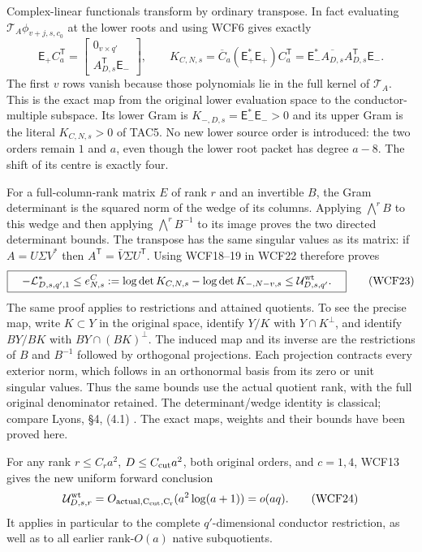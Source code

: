 Complex-linear functionals transform by ordinary transpose. In fact
evaluating $\mathcal T_A\phi_{v+j,s,c_0}$ at the lower roots and using
WCF6 gives exactly
\[
 \boxed{\quad \mathsf E_+ C_a^{\mathsf T}
       =\begin{bmatrix}0_{v\times q'}\\ A_{D,s}^{\mathsf T}\mathsf E_-\end{bmatrix},
 \qquad
 K_{C,N,s}=\overline C_a(\mathsf E_+^*\mathsf E_+)C_a^{\mathsf T}
       =\mathsf E_-^*\overline{A_{D,s}}A_{D,s}^{\mathsf T}\mathsf E_-.
 \quad}\tag{WCF22}
\]
The first $v$ rows vanish because those polynomials lie in the full
kernel of $\mathcal T_A$. This is the exact map from the original
lower evaluation space to the conductor-multiple subspace. Its lower
Gram is $K_{-,D,s}=\mathsf E_-^*\mathsf E_->0$ and its upper Gram
is the literal $K_{C,N,s}>0$ of TAC5. No new lower source order is
introduced: the two orders remain $1$ and $a$, even though the lower
root packet has degree $a-8$. The shift of its centre is exactly four.

For a full-column-rank matrix $E$ of rank $r$ and an invertible $B$,
the Gram determinant is the squared norm of the wedge of its columns.
Applying $\bigwedge^r B$ to this wedge and then applying
$\bigwedge^rB^{-1}$ to its image proves the two directed determinant
bounds. The transpose has the same singular values as its matrix:
if $A=U\Sigma V^*$ then $A^{\mathsf T}=\bar V\Sigma U^{\mathsf T}$.
Using WCF18--19 in WCF22 therefore proves
\[
 \boxed{\quad
 -\mathcal L_{D,s,q',1}^*
 \le e_{N,s}^{C}:=\log\det K_{C,N,s}-\log\det K_{-,N-v,s}
 \le\mathcal U^{\rm wt}_{D,s,q'}.
 \quad}\tag{WCF23}
\]
The same proof applies to restrictions and attained quotients. To see
the precise map, write $K\subset Y$ in the original space, identify
$Y/K$ with $Y\cap K^\perp$, and identify $BY/BK$ with
$BY\cap(BK)^\perp$. The induced map and its inverse are the
restrictions of $B$ and $B^{-1}$ followed by orthogonal projections.
Each projection contracts every exterior norm, which follows in an
orthonormal basis from its zero or unit singular values. Thus the
same bounds use the actual quotient rank, with the full original
denominator retained. The determinant/wedge identity is classical;
compare Lyons, \S4, (4.1) \cite{human:lyons2003}. The exact maps,
weights and their bounds have been proved here.

For any rank $r\le C_r a^2$, $D\le C_{\rm cut}a^2$, both original orders,
and $c=1,4$, WCF13 gives the new uniform forward conclusion
\[
 \mathcal U^{\rm wt}_{D,s,r}=O_{\rm actual,C_{\rm cut},C_r}(a^2\log(a+1))
                            =o(aq).
 \tag{WCF24}
\]
It applies in particular to the complete $q'$-dimensional conductor
restriction, as well as to all earlier rank-$O(a)$ native subquotients.

